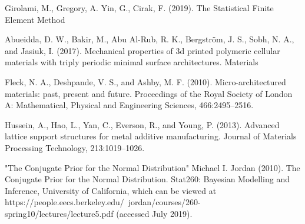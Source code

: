 \documentclass{article}
\begin{document}
\begin{thebibliography}{0}
	
	Girolami, M., Gregory, A. Yin, G., Cirak, F. (2019). The Statistical Finite Element Method
	
	Abueidda, D. W., Bakir, M., Abu Al-Rub, R. K., Bergstr\"{o}m, J. S., Sobh, N. A., and Jasiuk, I. (2017).
	Mechanical properties of 3d printed polymeric cellular materials with triply periodic minimal surface
	architectures. Materials %
	
	Fleck, N. A., Deshpande, V. S., and Ashby, M. F. (2010). Micro-architectured materials: past, present and
	future. Proceedings of the Royal Society of London A: Mathematical, Physical and Engineering Sciences,
	466:2495–2516.
	
	Hussein, A., Hao, L., Yan, C., Everson, R., and Young, P. (2013). Advanced lattice support structures for
	metal additive manufacturing. Journal of Materials Processing Technology, 213:1019–1026.
	
	"The Conjugate Prior for the Normal Distribution" Michael I. Jordan (2010). The Conjugate Prior for the Normal Distribution. Stat260: Bayesian Modelling and Inference, University of California, which can be viewed at https://people.eecs.berkeley.edu/~jordan/courses/260-spring10/lectures/lecture5.pdf (accessed July 2019).
	

\end{thebibliography}
\end{document}
